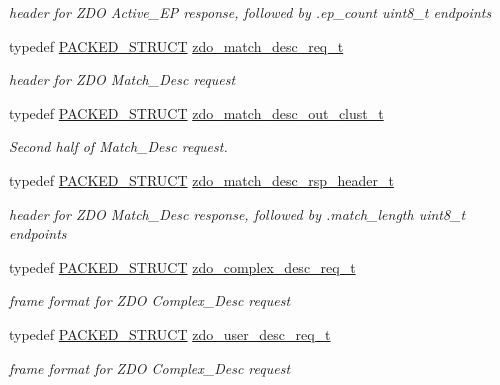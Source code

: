 \begin{DoxyCompactItemize}
\begin{DoxyCompactList}\small\item\em header for Z\-D\-O Active\-\_\-\-E\-P response, followed by {\ttfamily }.ep\-\_\-count uint8\-\_\-t endpoints \end{DoxyCompactList}\item 
typedef \hyperlink{group___s_x_a_ga4233297bd31be5c273d4fb0758cc54d7}{P\-A\-C\-K\-E\-D\-\_\-\-S\-T\-R\-U\-C\-T} \hyperlink{group__zdo_gac4eb6edc67f4b6c7cfb7b876f86c7316}{zdo\-\_\-match\-\_\-desc\-\_\-req\-\_\-t}
\begin{DoxyCompactList}\small\item\em header for Z\-D\-O Match\-\_\-\-Desc request \end{DoxyCompactList}\item 
typedef \hyperlink{group___s_x_a_ga4233297bd31be5c273d4fb0758cc54d7}{P\-A\-C\-K\-E\-D\-\_\-\-S\-T\-R\-U\-C\-T} \hyperlink{group__zdo_ga58933040f33055a85f168d27cba35b02}{zdo\-\_\-match\-\_\-desc\-\_\-out\-\_\-clust\-\_\-t}
\begin{DoxyCompactList}\small\item\em Second half of Match\-\_\-\-Desc request. \end{DoxyCompactList}\item 
typedef \hyperlink{group___s_x_a_ga4233297bd31be5c273d4fb0758cc54d7}{P\-A\-C\-K\-E\-D\-\_\-\-S\-T\-R\-U\-C\-T} \hyperlink{group__zdo_ga92bab7ada78e3865e606ce81bb610935}{zdo\-\_\-match\-\_\-desc\-\_\-rsp\-\_\-header\-\_\-t}
\begin{DoxyCompactList}\small\item\em header for Z\-D\-O Match\-\_\-\-Desc response, followed by {\ttfamily }.match\-\_\-length uint8\-\_\-t endpoints \end{DoxyCompactList}\item 
typedef \hyperlink{group___s_x_a_ga4233297bd31be5c273d4fb0758cc54d7}{P\-A\-C\-K\-E\-D\-\_\-\-S\-T\-R\-U\-C\-T} \hyperlink{group__zdo_ga9f34abaa1c2be82e33a7aaf37908f79c}{zdo\-\_\-complex\-\_\-desc\-\_\-req\-\_\-t}
\begin{DoxyCompactList}\small\item\em frame format for Z\-D\-O Complex\-\_\-\-Desc request \end{DoxyCompactList}\item 
typedef \hyperlink{group___s_x_a_ga4233297bd31be5c273d4fb0758cc54d7}{P\-A\-C\-K\-E\-D\-\_\-\-S\-T\-R\-U\-C\-T} \hyperlink{group__zdo_ga589d313ae350f36d7b9de7d26c3df977}{zdo\-\_\-user\-\_\-desc\-\_\-req\-\_\-t}
\begin{DoxyCompactList}\small\item\em frame format for Z\-D\-O Complex\-\_\-\-Desc request \end{DoxyCompactList}\item 

\end{DoxyCompactItemize}

